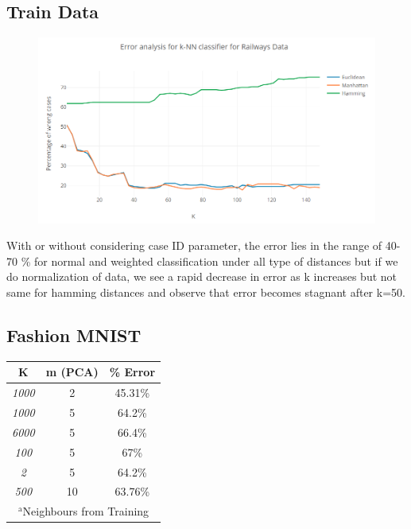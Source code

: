 \documentclass[conference]{IEEEtran}
\begin{document}
    \subsection{Train Data}
    \begin{figure}[htbp]
    \centerline{\includegraphics[width=\columnwidth]{knnrailways.png}}
    \label{fig}
    \end{figure}
    With or without considering case ID parameter, the error lies in the range of 40-70 \% for normal and weighted classification under all type of distances but if we do normalization of data, we see a rapid decrease in error as k increases but not same for hamming distances and observe that error becomes stagnant after k=50.
    \subsection{Fashion MNIST}
    \begin{table}[htbp]
    \begin{center}
    \begin{tabular}{|c|c|c|}
    \hline
    \textbf{K}&\textbf{m (PCA)}&\textbf{\% Error} \\
    \hline
    \textit{1000} &2&45.31\%\\
    \hline
    \textit{1000}&5&64.2\%\\
    \hline
    \textit{6000}&5&66.4\%\\
    \hline
    \textit{100}&5&67\%\\
    \hline
    \textit{2}&5&64.2\%\\
    \hline
    \textit{500}&10&63.76\%\\
    \hline
    \multicolumn{4}{s}{$^{\mathrm{a}}$Neighbours from Training }
    \end{tabular}
    \label{tab1}
    \end{center}
    \end{table}
    
\end{document}
